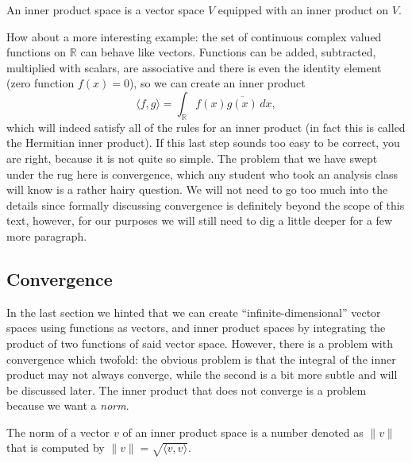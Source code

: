 \begin{definition}
  \nocite{axler_linear_2014}
  An inner product space is a vector space \(V\) equipped with an inner
  product on \(V\).
\end{definition}

How about a more interesting example: the set of continuous complex valued
functions on $\mathbb{R}$ can behave like vectors.  Functions can be added,
subtracted, multiplied with scalars, are associative and there is even the
identity element (zero function \(f(x) = 0\)), so we can create an inner
product
\[
  \langle f, g \rangle = \int_\mathbb{R} f(x) \overline{g(x)} \, dx,
\]
which will indeed satisfy all of the rules for an inner product (in fact this
is called the Hermitian inner product\nocite{allard_mathematics_2009}). If
this last step sounds too easy to be correct, you are right, because it is not
quite so simple. The problem that we have swept under the rug here is
convergence, which any student who took an analysis class will know is a
rather hairy question. We will not need to go too much into the details since
formally discussing convergence is definitely beyond the scope of this text,
however, for our purposes we will still need to dig a little deeper for a few
more paragraph.

\subsection{Convergence}

In the last section we hinted that we can create ``infinite-dimensional''
vector spaces using functions as vectors, and inner product spaces by
integrating the product of two functions of said vector space. However, there
is a problem with convergence which twofold: the obvious problem is that the
integral of the inner product may not always converge, while the second is a
bit more subtle and will be discussed later. The inner product that does
not converge is a problem because we want a \emph{norm}.

\begin{definition}[\(L^2\) norm]
  \nocite{axler_linear_2014}
  The norm of a vector \(v\) of an inner product space is a number
  denoted as \(\| v \|\) that is computed by \(\| v \| = \sqrt{\langle v, v
  \rangle}\).
\end{definition}

